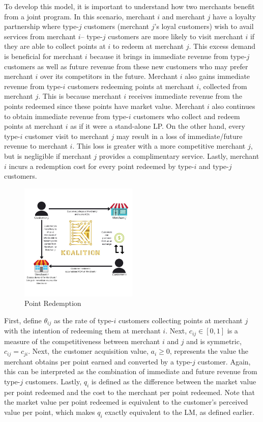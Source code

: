 To develop this model, it is important to understand how two merchants benefit from a joint program. In this scenario, merchant $i$ and merchant $j$ have a loyalty partnership where type-$j$ customers (merchant $j$'s loyal customers) wish to avail services from merchant $i$-- type-$j$ customers are more likely to visit merchant $i$ if they are able to collect points at $i$ to redeem at merchant $j$. This excess demand is beneficial for merchant $i$ because it brings in immediate revenue from type-$j$ customers as well as future revenue from these new customers who may prefer merchant $i$ over its competitors in the future. Merchant $i$ also gains immediate revenue from type-$i$ customers redeeming points at merchant $i$, collected from merchant $j$. This is because merchant $i$ receives immediate revenue from the points redeemed since these points have market value. Merchant $i$ also continues to obtain immediate revenue from type-$i$ customers who collect and redeem points at merchant $i$ as if it were a stand-alone LP. On the other hand, every type-$i$ customer visit to merchant $j$ may result in a loss of immediate/future revenue to merchant $i$. This loss is greater with a more competitive merchant $j$, but is negligible if merchant $j$ provides a complimentary service. Lastly, merchant $i$ incurs a redemption cost for every point redeemed by type-$i$ and type-$j$ customers.
%
\begin{figure}[H] %
	\centering
	\includegraphics[keepaspectratio, width=0.5\textwidth]{images/PointRedemption.png}
	\caption{Point Redemption} \label{fig:PointRedemption}
\end{figure}

First, define $\theta_{ij}$ as the rate of type-$i$ customers collecting points at merchant $j$ with the intention of redeeming them at merchant $i$. Next, $c_{ij} \in [0, 1]$ is a measure of the competitiveness between merchant $i$ and $j$ and is symmetric, \ie\ $c_{ij} = c_{ji}$. Next, the customer acquisition value, $a_i \geq 0$, represents the value the merchant obtains per point earned and converted by a type-$j$ customer. Again, this can be interpreted as the combination of immediate and future revenue from type-$j$ customers. Lastly, $q_i$ is defined as the difference between the market value per point redeemed and the cost to the merchant per point redeemed. Note that the market value per point redeemed is equivalent to the customer's perceived value per point, which makes $q_i$ exactly equivalent to the LM, as defined earlier. 

